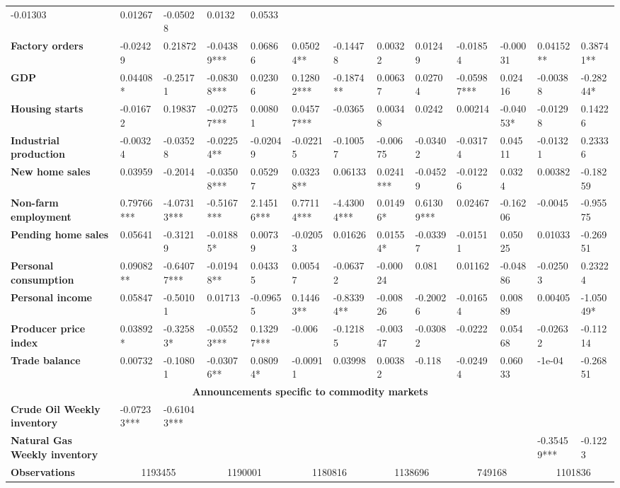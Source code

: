 \begin{sidewaystable}
{\begin{tabular}{@{}lllllllllllll@{}}
-0.01303 & 0.01267 & -0.05028 & 0.0132 & 0.0533 \\ \textbf{Factory orders}& -0.02429 & 0.21872 & -0.04389*** & 0.06866 & 0.05024**& -0.14478& 0.00322 & 0.01249 & -0.01854 & -0.00031 & 0.04152** & 0.38741** \\ \textbf{GDP}& 0.04408* & -0.25171 & -0.08308*** & 0.02306 & 0.12802***& -0.1874**& 0.00637 & 0.02704 & -0.05987*** & 0.02416 & -0.00388 & -0.28244* \\ \textbf{Housing starts}& -0.01672 & 0.19837 & -0.02757*** & 0.00801 & 0.04577***& -0.0365& 0.00348 & 0.0242 & 0.00214 & -0.04053* & -0.01298 & 0.14226 \\ \textbf{Industrial production}& -0.00324 & -0.03528 & -0.02254** & -0.02049 & -0.02215 & -0.10057 & -0.00675 & -0.03402 & -0.03174 & 0.04511 & -0.01321 & 0.23336 \\ \textbf{New home sales}& 0.03959 & -0.2014 & -0.03508*** & 0.05297 & 0.03238**& 0.06133& 0.0241*** & -0.04529 & -0.01226 & 0.0324 & 0.00382 & -0.18259 \\ \textbf{Non-farm employment}& 0.79766*** & -4.07313*** & -0.5167*** & 2.14516*** & 0.77114***& -4.43004***& 0.01496* & 0.61309*** & 0.02467 & -0.16206 & -0.0045 & -0.95575 \\ \textbf{Pending home sales}& 0.05641 & -0.31219 & -0.01885* & 0.00739 & -0.02053 & 0.01626 & 0.01554* & -0.03397 & -0.01511 & 0.05025 & 0.01033 & -0.26951 \\ \textbf{Personal consumption}& 0.09082** & -0.64077*** & -0.01948** & 0.04335 & 0.00547 & -0.06372 & -0.00024 & 0.081 & 0.01162 & -0.04886 & -0.02503 & 0.23224 \\ \textbf{Personal income}& 0.05847 & -0.50101 & 0.01713 & -0.09655 & 0.14463**& -0.83394**& -0.00826 & -0.20026 & -0.01654 & 0.00889 & 0.00405 & -1.05049* \\ \textbf{Producer price index}& 0.03892* & -0.32583* & -0.05523*** & 0.13297*** & -0.006 & -0.12185 & -0.00347 & -0.03082 & -0.0222 & 0.05468 & -0.02632 & -0.11214 \\ \textbf{Trade balance}& 0.00732 & -0.10801 & -0.03076** & 0.08094* & -0.00911 & 0.03998 & 0.00382 & -0.118 & -0.02494 & 0.06033 & -1e-04 & -0.26851 \\  \midrule \multicolumn{13}{c}{\textbf{Announcements specific to commodity markets}} \\ \midrule \textbf{Crude Oil Weekly inventory}& -0.07233*** & -0.61043*** &  &  &  &  &  &  &  &  &  &  \\ \textbf{Natural Gas Weekly inventory}&  &  &  &  &  &  &  &  &  &  & -0.35459*** & -0.1223 \\  \midrule \textbf{Observations}             &\multicolumn{2}{c}{ 1193455 }                                                 & \multicolumn{2}{c}{ 1190001 }                                                 & \multicolumn{2}{c}{ 1180816 }                                                 & \multicolumn{2}{c}{ 1138696 }                                                 & \multicolumn{2}{c}{ 749168 }                                                   & \multicolumn{2}{c}{ 1101836 }                                                 \\ 
\end{tabular}}
\end{sidewaystable}
